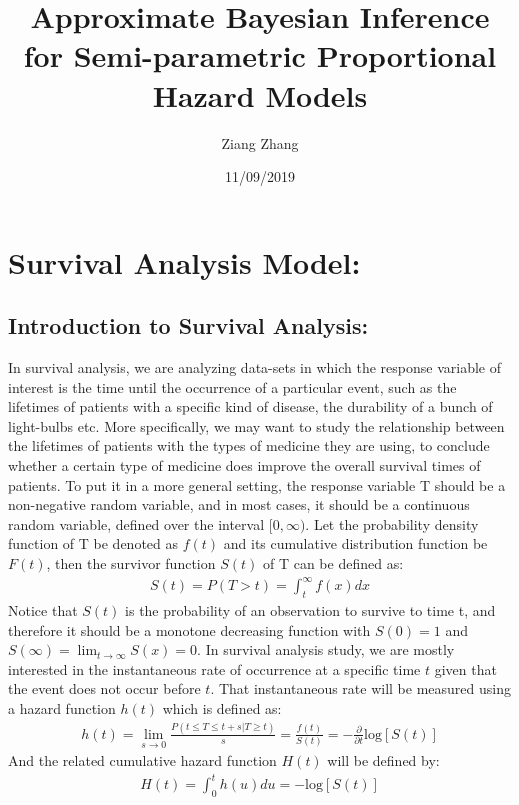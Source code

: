 \documentclass[]{article}
\title{Approximate Bayesian Inference for Semi-parametric Proportional Hazard
Models}
\author{Ziang Zhang}
\date{11/09/2019}
\begin{document}
\maketitle

\hypertarget{survival-analysis-model}{%
\section{Survival Analysis Model:}\label{survival-analysis-model}}

\hypertarget{introduction-to-survival-analysis}{%
\subsection{Introduction to Survival
Analysis:}\label{introduction-to-survival-analysis}}

In survival analysis, we are analyzing data-sets in which the response
variable of interest is the time until the occurrence of a particular
event, such as the lifetimes of patients with a specific kind of
disease, the durability of a bunch of light-bulbs etc. More
specifically, we may want to study the relationship between the
lifetimes of patients with the types of medicine they are using, to
conclude whether a certain type of medicine does improve the overall
survival times of patients. To put it in a more general setting, the
response variable T should be a non-negative random variable, and in
most cases, it should be a continuous random variable, defined over the
interval \([0,\infty)\). Let the probability density function of T be
denoted as \(f(t)\) and its cumulative distribution function be
\(F(t)\), then the survivor function \(S(t)\) of T can be defined as:
\begin{equation}\begin{aligned}\label{eqn:survivor}
S(t) = P(T > t) = \int_{t}^{\infty} f(x) dx
\end{aligned}\end{equation} Notice that \(S(t)\) is the probability of
an observation to survive to time t, and therefore it should be a
monotone decreasing function with \(S(0) = 1\) and
\(S(\infty) = \lim_{t\to\infty} S(x) = 0\). In survival analysis study,
we are mostly interested in the instantaneous rate of occurrence at a
specific time \(t\) given that the event does not occur before \(t\).
That instantaneous rate will be measured using a hazard function
\(h(t)\) which is defined as:
\begin{equation}\begin{aligned}\label{eqn:hazard}
h(t) = \lim_{s\to 0} \frac{P(t\le T \le t+s |T\ge t)}{s} = \frac{f(t)}{S(t)} = -\frac{\partial}{\partial t}\text{log}[S(t)]
\end{aligned}\end{equation} And the related cumulative hazard function
\(H(t)\) will be defined by:
\begin{equation}\begin{aligned}\label{eqn:chazard}
H(t) = \int_{0}^{t} h(u) du = -\text{log}[S(t)]
\end{aligned}\end{equation}
\end{document}

